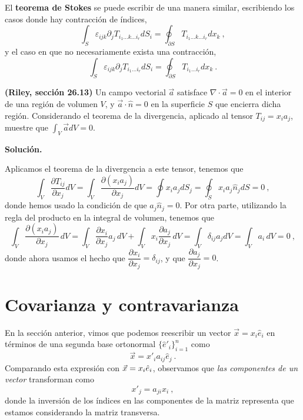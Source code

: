 El \textbf{teorema de Stokes} se puede escribir de una manera similar, escribiendo los casos donde hay contracción de índices,
\begin{equation}
    \int_S \varepsilon_{ijk} \partial_j T_{i_1 \dots k \dots i_r} dS_i = \oint_{\partial S} T_{i_1 \dots k \dots i_r} dx_k \ ,
\end{equation}
y el caso en que no necesariamente exista una contracción,
\begin{equation}
    \int_S \varepsilon_{ijk} \partial_j T_{i_1 \dots i_r} dS_i = \oint_{\partial S} T_{i_1 \dots i_r} dx_k \ .
\end{equation}

\begin{ejemplo}
    \textbf{(Riley, sección 26.13)} Un campo vectorial $\vec{a}$ satisface $\nabla \cdot \vec{a} = 0$ en el interior de una región de volumen $V$, y $\vec{a} \cdot \hat{n} = 0$ en la superficie $S$ que encierra dicha región. Considerando el teorema de la divergencia, aplicado al tensor $T_{ij} = x_i a_j$, muestre que $\int_V \vec{a} dV = 0$.

    \textbf{Solución.}

    Aplicamos el teorema de la divergencia a este tensor, tenemos que
    \begin{equation*}
        \int_V \frac{\partial T_{ij}}{\partial x_j} dV = \int_V \frac{\partial(x_i a_j)}{\partial x_j} dV = \oint x_i a_j dS_j = \oint_S x_i a_j \hat{n}_j dS = 0 \ ,
    \end{equation*}
    donde hemos usado la condición de que $a_j \hat{n}_j = 0$. Por otra parte, utilizando la regla del producto en la integral de volumen, tenemos que
    \begin{equation*}
        \int_V \frac{\partial(x_i a_j)}{\partial x_j} \, dV = \int_V \frac{\partial x_i}{\partial x_j} a_j \, dV + \int_V x_i \frac{\partial a_j}{\partial x_j} \, dV = \int_V \delta_{ij} a_j dV = \int_V a_i \, dV = 0 \ ,
    \end{equation*}
    donde ahora usamos el hecho que $\dfrac{\partial x_i}{\partial x_j} = \delta_{ij}$, y que $\dfrac{\partial a_j}{\partial x_j} = 0$.
\end{ejemplo}




\section{Covarianza y contravarianza}

En la sección anterior, vimos que podemos reescribir un vector $\vec{x} = x_i \hat{e}_i$ en términos de una segunda base ortonormal $\{\hat{e}'_i\}_{i=1}^n$ como
\begin{equation} \label{eq:transformacion-vector-einstein}
    \vec{x} = x'_i a_{ij} \hat{e}_j \ .
\end{equation}
Comparando esta expresión con $\vec{x} = x_i \hat{e}_i$, observamos que \emph{las componentes de un vector} transforman como
\begin{equation} \label{eq:transformacion-componentes}
    x'_j = a_{ji} x_i \ , 
\end{equation}
donde la inversión de los índices en las componentes de la matriz representa que estamos considerando la matriz transversa.


